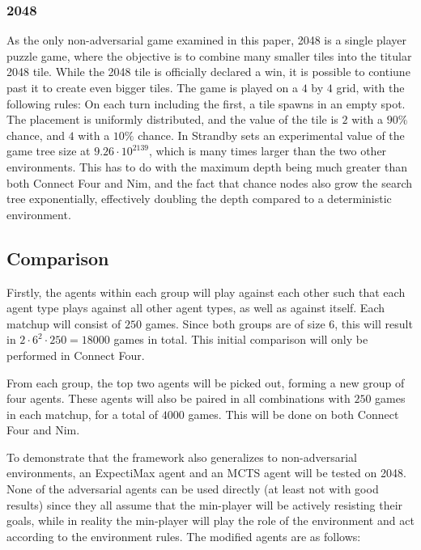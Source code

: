 \subsubsection{2048}
As the only non-adversarial game examined in this paper, 2048 is a single player puzzle game, where the objective is to combine many smaller tiles into the titular 2048 tile. While the 2048 tile is officially declared a win, it is possible to contiune past it to create even bigger tiles. The game is played on a $4$ by $4$ grid, with the following rules: On each turn including the first, a tile spawns in an empty spot. The placement is uniformly distributed, and the value of the tile is $2$ with a $90\%$ chance, and $4$ with a $10\%$ chance. In \cite{Strandby2016} Strandby sets an experimental value of the game tree size at $9.26 \cdot 10^{2139}$, which is many times larger than the two other environments. This has to do with the maximum depth being much greater than both Connect Four and Nim, and the fact that chance nodes also grow the search tree exponentially, effectively doubling the depth compared to a deterministic environment.

\subsection{Comparison}
Firstly, the agents within each group will play against each other
such that each agent type plays against all other agent types, as well
as against itself. Each matchup will consist of $250$ games. Since both groups are of size 6, this will result in $2 \cdot 6^2 \cdot 250 = 18000$ games in total. This initial comparison will only be performed in Connect Four.

From each group, the top two agents will be picked out, forming a new group of four agents. These agents will also be paired in all combinations with $250$ games in each matchup, for a total of $4000$ games. This will be done on both 
Connect Four and Nim.

To demonstrate that the framework also generalizes to non-adversarial environments, an ExpectiMax agent and an MCTS agent will be tested on 2048. None of the adversarial agents can be used directly (at least not with good results) since they all assume that the min-player will be actively resisting their goals, while in reality the min-player will play the role of the environment and act according to the environment rules. The modified agents are as follows:


